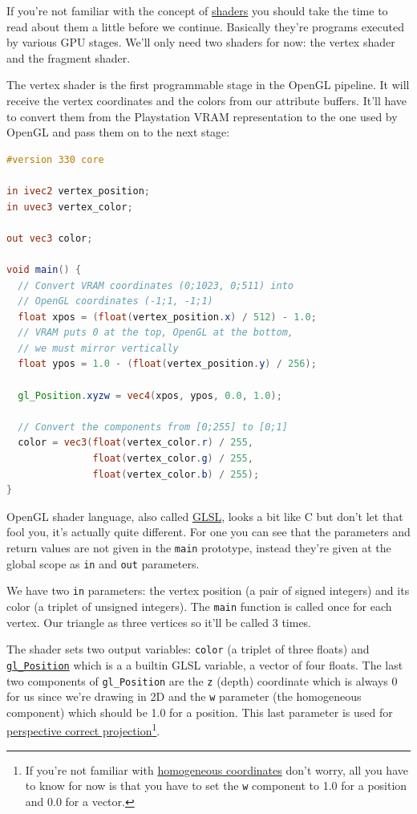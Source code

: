 \documentclass[a4paper]{article}
\newcommand{\code}[1] {\texttt{#1}}
\begin{document}
If you're not familiar with the concept of
\href{https://en.wikipedia.org/wiki/Shader}{shaders} you should take
the time to read about them a little before we continue. Basically
they're programs executed by various GPU stages. We'll only need two
shaders for now: the vertex shader and the fragment shader.

The vertex shader is the first programmable stage in the OpenGL
pipeline. It will receive the vertex coordinates and the colors from
our attribute buffers. It'll have to convert them from the Playstation
VRAM representation to the one used by OpenGL and pass them on to the
next stage:

\begin{lstlisting}[language=glsl]
#version 330 core

in ivec2 vertex_position;
in uvec3 vertex_color;

out vec3 color;

void main() {
  // Convert VRAM coordinates (0;1023, 0;511) into
  // OpenGL coordinates (-1;1, -1;1)
  float xpos = (float(vertex_position.x) / 512) - 1.0;
  // VRAM puts 0 at the top, OpenGL at the bottom,
  // we must mirror vertically
  float ypos = 1.0 - (float(vertex_position.y) / 256);

  gl_Position.xyzw = vec4(xpos, ypos, 0.0, 1.0);

  // Convert the components from [0;255] to [0;1]
  color = vec3(float(vertex_color.r) / 255,
               float(vertex_color.g) / 255,
               float(vertex_color.b) / 255);
}
\end{lstlisting}

OpenGL shader language, also called
\href{https://en.wikipedia.org/wiki/OpenGL_Shading_Language}{GLSL},
looks a bit like C but don't let that fool you, it's actually quite
different. For one you can see that the parameters and return values
are not given in the \code{main} prototype, instead they're given at
the global scope as \code{in} and \code{out} parameters.

We have two \code{in} parameters: the vertex position (a pair of
signed integers) and its color (a triplet of unsigned integers). The
\code{main} function is called once for each vertex. Our triangle as
three vertices so it'll be called 3 times.

The shader sets two output variables: \code{color} (a triplet of three
floats) and
\href{https://www.opengl.org/sdk/docs/man4/html/gl_Position.xhtml}{\code{gl\_Position}}
which is a a builtin GLSL variable, a vector of four floats. The last
two components of \code{gl\_Position} are the \code{z} (depth)
coordinate which is always 0 for us since we're drawing in 2D and the
\code{w} parameter (the homogeneous component) which should be 1.0 for
a position. This last parameter is used for
\href{https://en.wikipedia.org/wiki/Transformation_matrix#Perspective_projection}{perspective
  correct projection}\footnote{If you're not familiar with
  \href{https://en.wikipedia.org/wiki/Homogeneous_coordinates}{homogeneous
    coordinates} don't worry, all you have to know for now is that you
  have to set the \code{w} component to 1.0 for a position and 0.0 for
  a vector.}.
\end{document}
